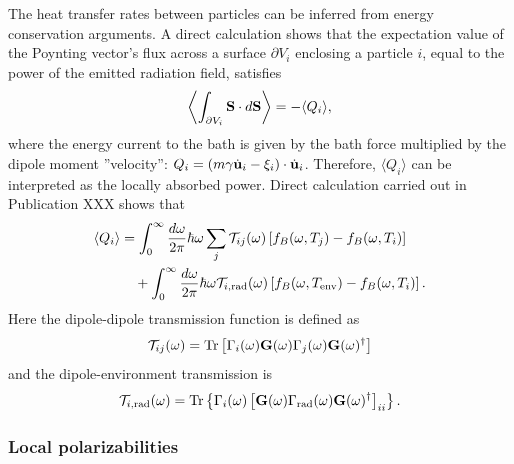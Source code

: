 The heat transfer rates between particles can be inferred from energy conservation arguments. A direct calculation shows that the expectation value of the Poynting vector's flux across a surface $\partial V_i$ enclosing a particle $i$, equal to the power of the emitted radiation field, satisfies 
\begin{equation}
 \left\langle \int_{\partial V_i} \mathbf{S} \cdot d\mathbf{S} \right\rangle = - \langle Q_i \rangle,
\end{equation}
where the energy current to the bath is given by the bath force multiplied by the dipole moment ''velocity'': $Q_i = (m\gamma \dot{\mathbf{u}}_i-\xi_i)\cdot \dot{\mathbf{u}}_i$. Therefore, $\langle Q_i\rangle$ can be interpreted as the locally absorbed power. Direct calculation carried out in Publication XXX shows that 
\begin{alignat}{2}
 \langle Q_i \rangle &= \int_0^{\infty}\frac{d\omega}{2\pi} \hbar\omega \sum_{j} \mathcal{T}_{ij}(\omega) \left[f_B(\omega,T_j)-f_B(\omega,T_i ) \right] \notag \\
  & \quad + \int_0^{\infty} \frac{d\omega}{2\pi} \hbar \omega \mathcal{T}_{i,\textrm{rad}}(\omega)\left[ f_B(\omega,T_{\textrm{env}})-f_B(\omega,T_i)\right].
\end{alignat}
Here the dipole-dipole transmission function is defined as
\begin{equation}
 \mathcal{T}_{ij}(\omega) = \textrm{Tr} \left[\Gamma_i(\omega) \mathbf{G}(\omega) \Gamma_j(\omega) \mathbf{G}(\omega)^{\dagger} \right]
\end{equation}
and the dipole-environment transmission is 
\begin{equation}
 \mathcal{T}_{i,\textrm{rad}}(\omega) =  \textrm{Tr} \left\{ \Gamma_i(\omega) \left[ \mathbf{G}(\omega) \Gamma_{\textrm{rad}}(\omega) \mathbf{G}(\omega)^{\dagger} \right]_{ii} \right\}.
\end{equation}

\subsubsection{Local polarizabilities}

